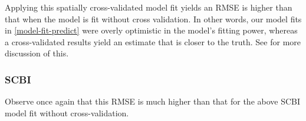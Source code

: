 \documentclass[12pt]{article}
\newenvironment{Shaded}{\begin{snugshade}}{\end{snugshade}}
\newcommand{\CommentTok}[1]{\textcolor[rgb]{0.56,0.35,0.01}{\textit{#1}}}
\newcommand{\DataTypeTok}[1]{\textcolor[rgb]{0.13,0.29,0.53}{#1}}
\newcommand{\KeywordTok}[1]{\textcolor[rgb]{0.13,0.29,0.53}{\textbf{#1}}}
\newcommand{\NormalTok}[1]{#1}
\newcommand{\OperatorTok}[1]{\textcolor[rgb]{0.81,0.36,0.00}{\textbf{#1}}}
\newcommand{\StringTok}[1]{\textcolor[rgb]{0.31,0.60,0.02}{#1}}
\begin{document}
Applying this spatially cross-validated model fit yields an RMSE is
higher than that when the model is fit without cross validation. In
other words, our model fits in \ref{model-fit-predict} were overly
optimistic in the model's fitting power, whereas a cross-validated
results yield an estimate that is closer to the truth. See
\citet{allen_permutation_2020} for more discussion of this.

\begin{Shaded}
\end{Shaded}

\hypertarget{scbi-4}{%
\subsubsection{SCBI}\label{scbi-4}}

Observe once again that this RMSE is much higher than that for the above
SCBI model fit without cross-validation.

\begin{Shaded}
\end{Shaded}
\end{document}
